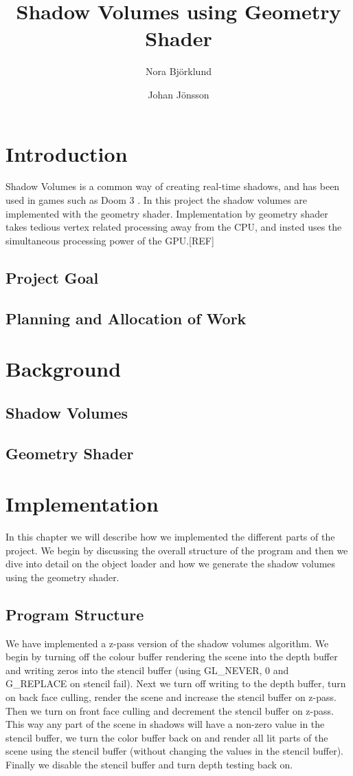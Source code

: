 \documentclass[a4paper, 12pt]{article}
\title{Shadow Volumes using Geometry Shader}
\author{Nora Björklund \and Johan Jönsson}
\begin{document}
\maketitle
\tableofcontents
\newpage
\section{Introduction}
Shadow Volumes is a common way of creating real-time shadows, and has been used
in games such as Doom 3 \cite{gpug1}. In this project the shadow volumes are implemented with the geometry shader. Implementation by geometry shader takes tedious vertex related processing away from the CPU, and insted uses the simultaneous processing power of the GPU.[REF]
\subsection{Project Goal}
\subsection{Planning and Allocation of Work}
\section{Background}
\subsection{Shadow Volumes}
\subsection{Geometry Shader}
\section{Implementation}
In this chapter we will describe how we implemented the different parts of the
project. We begin by discussing the overall structure of the program and then we
dive into detail on the object loader and how we generate the shadow volumes
using the geometry shader.

\subsection{Program Structure}
We have implemented a z-pass version of the shadow volumes algorithm. We begin
by turning off the colour buffer rendering the scene into the depth buffer and
writing zeros into the stencil buffer (using GL\_NEVER, 0 and G\_REPLACE on
stencil fail). Next we turn off writing to the depth buffer, turn on back face
culling, render the scene and increase the stencil buffer on z-pass. Then we
turn on front face culling and decrement the stencil buffer on z-pass. This way
any part of the scene in shadows will have a non-zero value in the stencil
buffer, we turn the color buffer back on and render all lit parts of the scene
using the stencil buffer (without changing the values in the stencil buffer).
Finally we disable the stencil buffer and turn depth testing back on.
\end{document}
